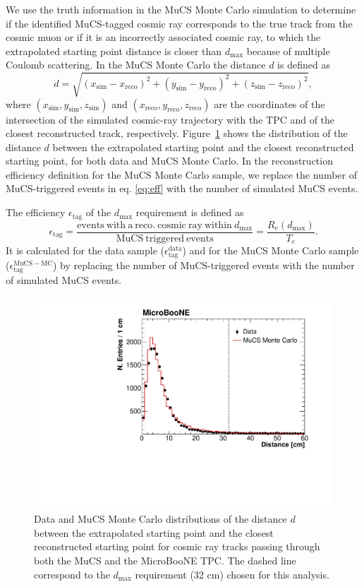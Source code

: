 \documentclass[a4paper,11pt]{article}
\begin{document}
We use the truth information in the MuCS Monte Carlo simulation to determine if the identified MuCS-tagged cosmic ray corresponds to the true track from the cosmic muon or if it is an incorrectly associated cosmic ray, to which the extrapolated starting point distance is closer than $d_{\mathrm{max}}$ because of multiple Coulomb scattering.
In the MuCS Monte Carlo the distance $d$ is defined as
\begin{equation}\label{eq:d_mc}
d = \sqrt{(x_{\mathrm{sim}}-x_{\mathrm{reco}})^2+(y_{\mathrm{sim}}-y_{\mathrm{reco}})^2+(z_{\mathrm{sim}}-z_{\mathrm{reco}})^2},
\end{equation}
where $(x_{\mathrm{sim}},y_{\mathrm{sim}},z_{\mathrm{sim}})$ and $(x_{\mathrm{reco}},y_{\mathrm{reco}},z_{\mathrm{reco}})$ are the coordinates of the intersection of the simulated cosmic-ray trajectory with the TPC and of the closest reconstructed track, respectively. Figure~\ref{fig:dist} shows the distribution of the distance $d$ between the extrapolated starting point and the closest reconstructed starting point, for both data and MuCS Monte Carlo.
In the reconstruction efficiency definition for the MuCS Monte Carlo sample, we replace the number of MuCS-triggered events in eq. \eqref{eq:eff} with the number of simulated MuCS events. 

The efficiency $\epsilon_{\mathrm{tag}}$ of the $d_{\mathrm{max}}$ requirement is defined as
\begin{equation}
  \epsilon_{\mathrm{tag}}=\frac{\mathrm{events~with~a~reco.~cosmic~ray~within~}d_{\mathrm{max}}}{\mathrm{MuCS~triggered~events}} = \frac{R_{e}(d_{\mathrm{max}})}{T_{e}}.
\end{equation}
It is calculated for the data sample ($\epsilon^{\mathrm{data}}_{\mathrm{tag}}$) and for the MuCS Monte Carlo sample ($\epsilon^{\mathrm{MuCS-MC}}_{\mathrm{tag}}$) by replacing the number of MuCS-triggered events with the number of simulated MuCS events.

\begin{figure}[htbp]
  \begin{center}
    \includegraphics[width=0.7\linewidth]{figures/dist.pdf}
    \caption{Data and MuCS Monte Carlo distributions of the distance $d$ between the extrapolated starting point and the closest reconstructed starting point for cosmic ray tracks passing through both the MuCS and the MicroBooNE TPC. The dashed line correspond to the $d_{\mathrm{max}}$ requirement (32 cm) chosen for this analysis.} \label{fig:dist}
  \end{center}
\end{figure}
\end{document}
